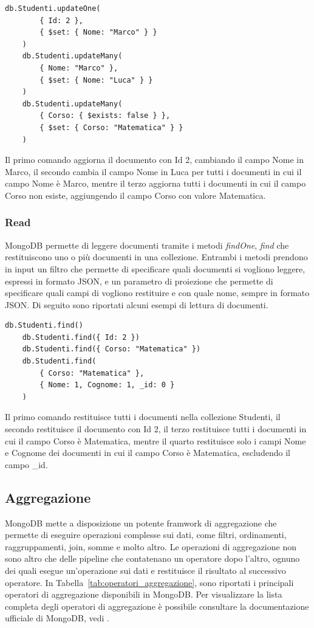 \documentclass{article}
\begin{document}
\begin{lstlisting}[language=MongoDBShell, caption={Esempio di update in MongoDB}]
    db.Studenti.updateOne(
        { Id: 2 },
        { $set: { Nome: "Marco" } }
    )
    db.Studenti.updateMany(
        { Nome: "Marco" },
        { $set: { Nome: "Luca" } }
    )
    db.Studenti.updateMany(
        { Corso: { $exists: false } },
        { $set: { Corso: "Matematica" } }   
    )
\end{lstlisting}
Il primo comando aggiorna il documento con Id 2, cambiando il campo Nome in Marco, il secondo cambia il campo Nome in Luca per tutti i documenti
in cui il campo Nome è Marco, mentre il terzo aggiorna tutti i documenti in cui il campo Corso non esiste, aggiungendo il campo Corso con valore Matematica.

\subsubsection{Read}
MongoDB permette di leggere documenti tramite i metodi \textit{findOne}, \textit{find} che restituiscono uno o più documenti in una collezione.
Entrambi i metodi prendono in input un filtro che permette di specificare quali documenti si vogliono leggere, espressi in formato JSON, e un 
parametro di proiezione che permette di specificare quali campi di vogliono restituire e con quale nome, sempre in formato JSON. Di seguito sono riportati alcuni
esempi di lettura di documenti.
\begin{lstlisting}[language=MongoDBShell, caption={Esempio di read in MongoDB}]
    db.Studenti.find()
    db.Studenti.find({ Id: 2 })
    db.Studenti.find({ Corso: "Matematica" })
    db.Studenti.find(
        { Corso: "Matematica" },
        { Nome: 1, Cognome: 1, _id: 0 }
    )
\end{lstlisting}
Il primo comando restituisce tutti i documenti nella collezione Studenti, il secondo restituisce il documento con Id 2, il terzo restituisce tutti i documenti in cui il campo Corso è Matematica, mentre il quarto restituisce solo i campi Nome e Cognome dei documenti in cui il campo Corso è Matematica, escludendo il campo \_id.

\subsection{Aggregazione}

MongoDB mette a disposizione un potente framwork di aggregazione che permette di eseguire operazioni complesse sui dati, come filtri,
ordinamenti, raggruppamenti, join, somme e molto altro. Le operazioni di aggregazione non sono altro che delle pipeline che contatenano un operatore
dopo l'altro, ognuno dei quali esegue un'operazione sui dati e restituisce il risultato al successivo operatore. In Tabella~\ref{tab:operatori_aggregazione}, 
sono riportati i principali operatori di aggregazione disponibili in MongoDB. Per visualizzare la lista completa degli operatori di aggregazione
è possibile consultare la documentazione ufficiale di MongoDB, vedi \cite{MongoDBDocumentation}.
\end{document}
